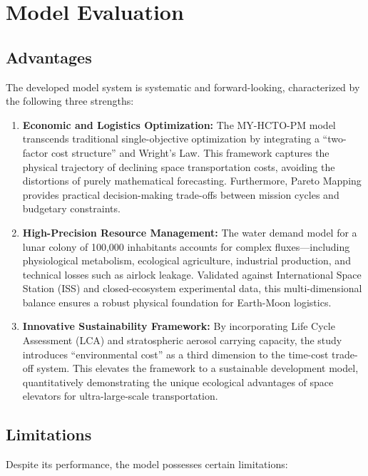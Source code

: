 \section{Model Evaluation}

\subsection{Advantages}

The developed model system is systematic and forward-looking, characterized by the following three strengths:

\begin{enumerate}
    \item \textbf{Economic and Logistics Optimization:} The MY-HCTO-PM model transcends traditional single-objective optimization by integrating a ``two-factor cost structure'' and Wright's Law. This framework captures the physical trajectory of declining space transportation costs, avoiding the distortions of purely mathematical forecasting. Furthermore, Pareto Mapping provides practical decision-making trade-offs between mission cycles and budgetary constraints.
    \item \textbf{High-Precision Resource Management:} The water demand model for a lunar colony of 100,000 inhabitants accounts for complex fluxes—including physiological metabolism, ecological agriculture, industrial production, and technical losses such as airlock leakage. Validated against International Space Station (ISS) and closed-ecosystem experimental data, this multi-dimensional balance ensures a robust physical foundation for Earth-Moon logistics.
    \item \textbf{Innovative Sustainability Framework:} By incorporating Life Cycle Assessment (LCA) and stratospheric aerosol carrying capacity, the study introduces ``environmental cost'' as a third dimension to the time-cost trade-off system. This elevates the framework to a sustainable development model, quantitatively demonstrating the unique ecological advantages of space elevators for ultra-large-scale transportation.
\end{enumerate}

\subsection{Limitations}

Despite its performance, the model possesses certain limitations:

